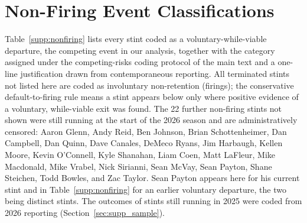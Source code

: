 \documentclass[12pt,USenglish]{article}
\begin{document}
\section{Non-Firing Event Classifications}
\label{sec:supp_nonfiring}

Table~\ref{supp:nonfiring} lists every stint coded as a voluntary-while-viable departure, the competing event in our analysis, together with the category assigned under the competing-risks coding protocol of the main text and a one-line justification drawn from contemporaneous reporting. All terminated stints not listed here are coded as involuntary non-retention (firings); the conservative default-to-firing rule means a stint appears below only where positive evidence of a voluntary, while-viable exit was found. The 22 further non-firing stints not shown were still running at the start of the 2026 season and are administratively censored: Aaron Glenn, Andy Reid, Ben Johnson, Brian Schottenheimer, Dan Campbell, Dan Quinn, Dave Canales, DeMeco Ryans, Jim Harbaugh, Kellen Moore, Kevin O'Connell, Kyle Shanahan, Liam Coen, Matt LaFleur, Mike Macdonald, Mike Vrabel, Nick Sirianni, Sean McVay, Sean Payton, Shane Steichen, Todd Bowles, and Zac Taylor. Sean Payton appears here for his current stint and in Table~\ref{supp:nonfiring} for an earlier voluntary departure, the two being distinct stints. The outcomes of stints still running in 2025 were coded from 2026 reporting (Section~\ref{sec:supp_sample}).
\end{document}
